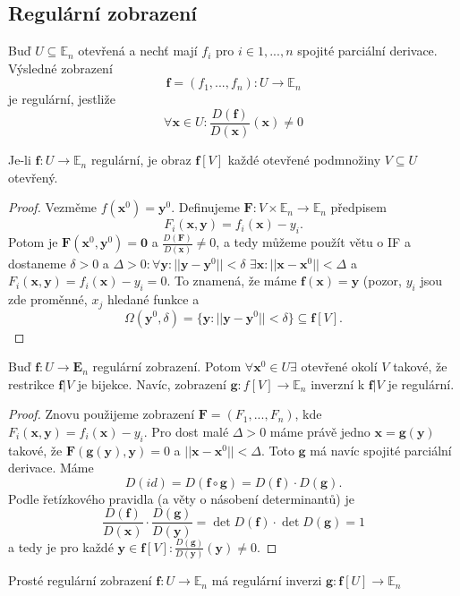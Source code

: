 \documentclass[../main.tex]{subfiles}
\begin{document}
\subsection{Regulární zobrazení}
\begin{definition}
	Buď $U \subseteq \mathbb{E}_n$ otevřená a nechť mají $f_i$ pro $i \in {1, ... , n}$
	spojité parciální derivace. Výsledné zobrazení
	\[ \mathbf{f} = (f_1, ... , f_n): U \to \mathbb{E}_n \]
	je regulární, jestliže
	\[ \forall \mathbf{x} \in U: \frac{D(\mathbf{f})}{D(\mathbf{x})}(\mathbf{x}) \neq 0 \]
\end{definition}

\begin{lemma}
	Je-li $\mathbf{f}: U \to \mathbb{E}_n$ regulární, je obraz $\mathbf{f}[V]$ každé otevřené podmnožiny
	$V \subseteq U$ otevřený.
\end{lemma}

\begin{proof}
	Vezměme $f(\textbf{x}^0) = \textbf{y}^0.$ Definujeme $\textbf{F} : V \times \mathbb{E}_n \rightarrow \mathbb{E}_n$ předpisem
	\[F_i(\textbf{x},\textbf{y}) = f_i(\textbf{x}) - y_i.\]
	Potom je $\textbf{F}(\textbf{x}^0,\textbf{y}^0) = \textbf{0}$
	a $\frac{D(\textbf{F})}{D(\textbf{x})} \neq 0$, 
	a tedy můžeme použít větu o IF a dostaneme 
	$\delta > 0$ a $\Delta > 0 : \forall \textbf{y} : ||\textbf{y} - \textbf{y}^0|| < \delta$ $\exists \textbf{x} : ||\textbf{x} - \textbf{x}^0|| < \Delta$ a 
	$F_i(\textbf{x},\textbf{y}) = f_i(\textbf{x}) - y_i = 0$. To znamená, že máme $\textbf{f}(\textbf{x}) = \textbf{y}$ (pozor, $y_i$ jsou zde proměnné, $x_j$ hledané funkce a
	\[\Omega(\textbf{y}^0,\delta) = \{\textbf{y} : ||\textbf{y} - \textbf{y}^0 || < \delta \} \subseteq \textbf{f}[V].\]
\end{proof}

\begin{lemma}
	Buď $\mathbf{f}: U \to \mathbf{E}_n$ regulární zobrazení. Potom $\forall \mathbf{x}^0 \in U \exists$
	otevřené okolí $V$ takové, že restrikce $\mathbf{f}|V$ je bijekce. Navíc, zobrazení
	$\mathbf{g}: f[V] \to \mathbb{E}_n$ inverzní k $\mathbf{f}|V$ je regulární.
\end{lemma}

\begin{proof}
	Znovu použijeme zobrazení $\textbf{F} = (F_1,...,F_n)$, kde $F_i(\textbf{x},\textbf{y}) = f_i(\textbf{x})-y_i$. Pro dost malé 
	$\Delta > 0$ máme právě jedno $\textbf{x} = \textbf{g}(\textbf{y})$ takové, že $\textbf{F}(\mathbf{g}(\textbf{y}),\textbf{y}) = 0$ a $||\textbf{x} - \textbf{x}^0|| < \Delta$.
	Toto $\textbf{g}$ má navíc spojité parciální derivace. Máme
	\[D(id) = D(\textbf{f}\circ\textbf{g}) = D(\textbf{f})\cdot D(\textbf{g}).\]
	Podle řetízkového pravidla (a věty o násobení determinantů) je 
	\[\frac{D(\textbf{f})}{D(\textbf{x})}\cdot\frac{D(\textbf{g})}{D(\textbf{y})} = \det D(\textbf{f})\cdot \det D(\textbf{g}) = 1\]
	a tedy je pro každé $\textbf{y} \in \textbf{f}[V] \colon \frac{D(\textbf{g})}{D(\textbf{y})}(\textbf{y}) \neq 0$.
\end{proof}

\begin{consequence}
	Prosté regulární zobrazení $\mathbf{f}: U \to \mathbb{E}_n$ má regulární inverzi
	$\mathbf{g}: \mathbf{f}[U] \to \mathbb{E}_n$
\end{consequence}
\end{document}

